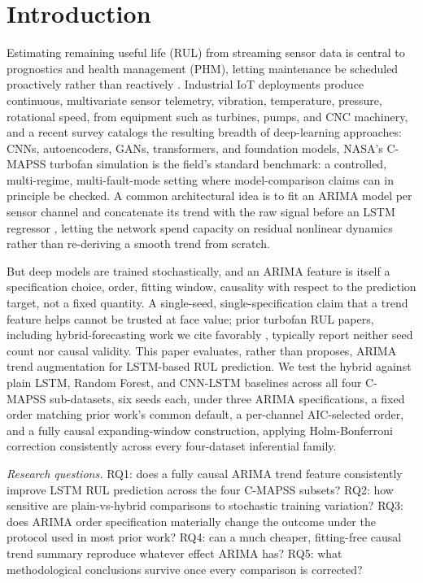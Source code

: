 \documentclass[conference]{IEEEtran}
\begin{document}
\section{Introduction}
Estimating remaining useful life (RUL) from streaming sensor data is central to prognostics and health management (PHM), letting maintenance be scheduled proactively rather than reactively \cite{saxena2008}. Industrial IoT deployments produce continuous, multivariate sensor telemetry, vibration, temperature, pressure, rotational speed, from equipment such as turbines, pumps, and CNC machinery, and a recent survey \cite{survey2025} catalogs the resulting breadth of deep-learning approaches: CNNs, autoencoders, GANs, transformers, and foundation models,  NASA's C-MAPSS turbofan simulation \cite{saxena2008} is the field's standard benchmark: a controlled, multi-regime, multi-fault-mode setting where model-comparison claims can in principle be checked. A common architectural idea is to fit an ARIMA model per sensor channel and concatenate its trend with the raw signal before an LSTM regressor \cite{zhang2003}, letting the network spend capacity on residual nonlinear dynamics rather than re-deriving a smooth trend from scratch.

But deep models are trained stochastically, and an ARIMA feature is itself a specification choice, order, fitting window, causality with respect to the prediction target, not a fixed quantity. A single-seed, single-specification claim that a trend feature helps cannot be trusted at face value; prior turbofan RUL papers, including hybrid-forecasting work we cite favorably \cite{arimalstmvalve2022}, typically report neither seed count nor causal validity. This paper evaluates, rather than proposes, ARIMA trend augmentation for LSTM-based RUL prediction. We test the hybrid against plain LSTM, Random Forest, and CNN-LSTM baselines across all four C-MAPSS sub-datasets, six seeds each, under three ARIMA specifications, a fixed order matching prior work's common default, a per-channel AIC-selected order, and a fully causal expanding-window construction, applying Holm-Bonferroni correction consistently across every four-dataset inferential family.

\emph{Research questions.} RQ1: does a fully causal ARIMA trend feature consistently improve LSTM RUL prediction across the four C-MAPSS subsets? RQ2: how sensitive are plain-vs-hybrid comparisons to stochastic training variation? RQ3: does ARIMA order specification materially change the outcome under the protocol used in most prior work? RQ4: can a much cheaper, fitting-free causal trend summary reproduce whatever effect ARIMA has? RQ5: what methodological conclusions survive once every comparison is corrected?
\end{document}

